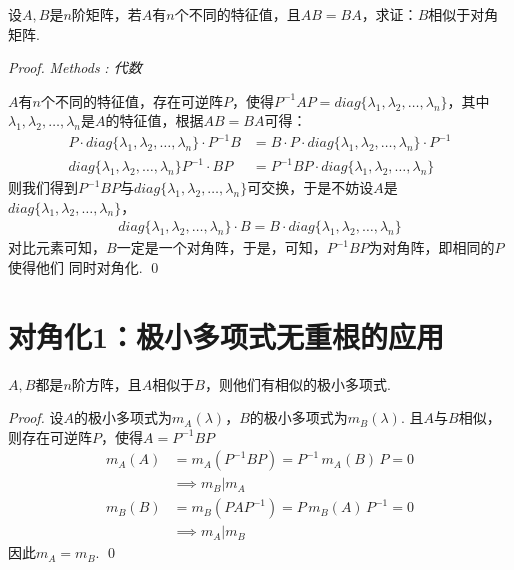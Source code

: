 \begin{proposition}[同时对角化]
	设$A,B$是$n$阶矩阵，若$A$有$n$个不同的特征值，且$AB=BA$，求证：$B$相似于对角矩阵.
\end{proposition}

\begin{proof}
	\emph{Methods\,\,\uppercase\expandafter{}: 代数}

	$A$有$n$个不同的特征值，存在可逆阵$P$，使得$P^{-1}AP=diag\{ \lambda_1, \lambda_2,\dots
	,\lambda_n \}$，其中$\lambda_1, \lambda_2,\dots,\lambda_n$是$A$的特征值，根据$AB=BA$可得：
	\begin{align*}
		P \cdot diag\{ \lambda_1, \lambda_2,\dots,\lambda_n \} \cdot P^{-1} B &= 
		B \cdot P \cdot diag\{ \lambda_1, \lambda_2,\dots,\lambda_n \} \cdot P^{-1} \\
		diag\{ \lambda_1, \lambda_2,\dots,\lambda_n \} P^{-1} \cdot B P &= 
		P^{-1} B  P \cdot diag\{ \lambda_1, \lambda_2,\dots,\lambda_n \}
	\end{align*}
	则我们得到$P^{-1} B P$与$diag\{ \lambda_1, \lambda_2,\dots,\lambda_n \}$可交换，于是不妨设$A$是
	$diag\{ \lambda_1, \lambda_2,\dots,\lambda_n \}$，
	\begin{align*}
		diag\{ \lambda_1, \lambda_2,\dots,\lambda_n \} \cdot B = B \cdot diag\{ \lambda_1, \lambda_2,\dots,\lambda_n \}
	\end{align*}
	对比元素可知，$B$一定是一个对角阵，于是，可知，$P^{-1} B P$为对角阵，即相同的$P$使得他们
	同时对角化. 
	\qed{}
\end{proof}

\section{对角化1：极小多项式无重根的应用}

\begin{proposition}[极小多项式是相似关系的不变量]
	$A,B$都是$n$阶方阵，且$A$相似于$B$，则他们有相似的极小多项式.
\end{proposition}

\begin{proof}
	设$A$的极小多项式为$m_A(\lambda)$，$B$的极小多项式为$m_B(\lambda)$. 且$A$与$B$相似，
	则存在可逆阵$P$，使得$A=P^{-1} B P$
	\begin{align*}
		m_A(A) &= m_A(P^{-1} B P) = P^{-1} \, m_A (B) \, P = 0 
		\\
		&\implies m_B | m_A \\
		m_B(B) &= m_B(P A P^{-1}) = P \,m_B(A)\, P^{-1} = 0 
		\\
		&\implies m_A | m_B
	\end{align*}
	因此$m_A=m_B$.
	\qed{}
\end{proof}

